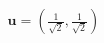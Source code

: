 \documentclass[preview]{standalone}
\begin{document}
\begin{align*}
\mathbf{u} = \left( \frac{1}{\sqrt{2}}, \frac{1}{\sqrt{2}} \right)
\end{align*}
\end{document}
